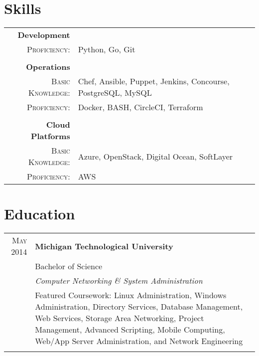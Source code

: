 \documentclass[a4paper,9pt]{extarticle}
\begin{document}
\section{Skills}
\begin{tabular}{rl}
 \textbf{Development}&\\\textsc{Proficiency:}&\footnotesize{Python, Go, Git}\\\multicolumn{2}{c}{}\\
 \textbf{Operations}&\\\textsc{Basic Knowledge:}&\footnotesize{Chef, Ansible, Puppet, Jenkins, Concourse, PostgreSQL, MySQL}\\\textsc{Proficiency:}&\footnotesize{Docker, BASH, CircleCI, Terraform}\\\multicolumn{2}{c}{}\\
 \textbf{Cloud Platforms}&\\\textsc{Basic Knowledge:}&\footnotesize{Azure, OpenStack, Digital Ocean, SoftLayer}\\\textsc{Proficiency:}&\footnotesize{AWS}
\end{tabular}

\section{Education}
\begin{tabular}{rp{8.5cm}}
 \textsc{May 2014}&\textbf{Michigan Technological University}\\&Bachelor of Science\\&\emph{Computer Networking \& System Administration}\\&\footnotesize{Featured Coursework: Linux Administration, Windows Administration, Directory Services, Database Management, Web Services, Storage Area Networking, Project Management, Advanced Scripting, Mobile Computing, Web/App Server Administration, and Network Engineering}\\\multicolumn{2}{c}{}\\
\end{tabular}
\end{document}
